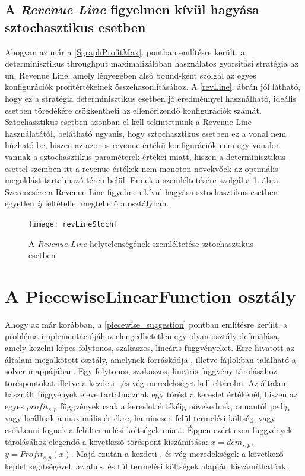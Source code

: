 \subsection{A \textit{Revenue Line} figyelmen kívül hagyása sztochasztikus esetben}
Ahogyan az már a \ref{SgraphProfitMax}. pontban említésre került, a determinisztikus throughput maximalizálóban használatos gyorsítási stratégia az un. Revenue Line, amely lényegében alsó bound-ként szolgál az egyes konfigurációk profitértékeinek összehasonlításához.
A \ref{revLine}. ábrán jól látható, hogy ez a stratégia determinisztikus esetben jó eredménnyel használható, ideális esetben töredékére csökkentheti az ellenőrizendő konfigurációk számát.
Sztochasztikus esetben azonban el kell tekintetnünk a Revenue Line használatától, belátható ugyanis, hogy sztochasztikus esetben ez a vonal nem húzható be, hiszen az azonos revenue értékű konfigurációk nem egy vonalon vannak a sztochasztikus paraméterek értékei miatt, hiszen a determinisztikus esettel szemben itt a revenue értékek nem monoton növekvőek az optimális megoldást tartalmazó téren belül.
Ennek a szemléltetésére szolgál a \ref{revLineStoch}. ábra.
Szerencsére a Revenue Line figyelmen kívül hagyása sztochasztikus esetben egyetlen \textit{if} feltétellel megtehető a  osztályban.
\begin{figure}[H]
\begin{center}
\texttt{[image: revLineStoch]}
\caption{A \textit{Revenue Line} helytelenségének szemléltetése sztochasztikus esetben}
\label{revLineStoch}
\end{center}
\end{figure} 
\section{A PiecewiseLinearFunction osztály} \label{piecewise_class}
Ahogy az már korábban, a \ref{piecewise_suggestion} pontban említésre került, a probléma implementációjához elengedhetetlen egy olyan osztály definiálása, amely kezelni képes folytonos, szakaszos, lineáris függvényeket.
Erre hivatott az általam megalkotott  osztály, amelynek forráskódja , illetve  fájlokban található a solver  mappájában.
Egy folytonos, szakaszos, lineáris függvény tárolásához töréspontokat illetve a kezdeti- ,és vég meredekséget kell eltárolni.
Az általam használt függvények eleve tartalmaznak egy törést a kereslet értékénél, hiszen az egyes $profit_{s,p}$ függvények csak a kereslet értékéig növekednek, onnantól pedig vagy beállnak a maximális értékre, ha nincsen felül termelési költség, vagy csökkenni fognak a felültermelési költségek miatt.
Éppen ezért ezen függvények tárolásához elegendő a következő töréspont kiszámítása: $x=dem_{s,p}$, $y=Profit_{s,p}(x)$. 
Majd ezután a kezdeti-, és vég meredekségek a következő képlet segítségével, az alul-, és túl termelési költségek alapján kiszámíthatóak.


